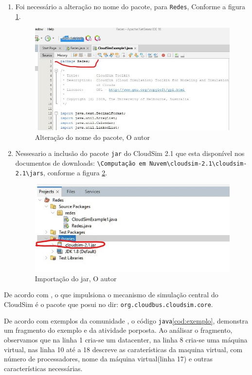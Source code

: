 \begin{enumerate}[label=\Roman{*}, ref=(\roman{*})]
  \item Foi necessário a alteração no nome do pacote, para \verb#Redes#, Conforme a figura \ref{fig:rename_pacote}. \newline
  \begin{figure}[h]
    \center
    \includegraphics[scale=.5]{figure/rename_pacote.jpg}
    \caption{Alteração do nome do pacote, O autor}
    \label{fig:rename_pacote}
  \end{figure}

  \item Nessesario a inclusão do pacote \verb#jar# do CloudSim 2.1 que esta disponível nos documentos de downloads: \verb#\Computação em Nuvem\cloudsim-2.1\cloudsim-2.1\jars#, conforme a figura \ref{fig:import_jar}. \newline
  \begin{figure}[h]
    \center
    \includegraphics[scale=.8]{figure/import_jar.jpg}
    \caption{Importação do jar, O autor}
    \label{fig:import_jar}
  \end{figure}
\end{enumerate}


\par De acordo com , o que impulsiona o mecanismo de simulação central do CloudSim é o pacote que posui no dir: \verb#org.cloudbus.cloudsim.core#.
\par De acordo com exemplos da comunidade , o código \verb#java#\ref{cod:exemplo}, demonstra um fragmento do exemplo e da atividade porposta. Ao análisar o fragmento, observamos que na linha 1 cria-se um datacenter, na linha 8 cria-se uma máquina virtual, nas linha 10 até a 18 descreve as caraterísticas da maquina virtual, com número de processadores, nome da máquina virtual(linha 17) e outras características necessárias.

